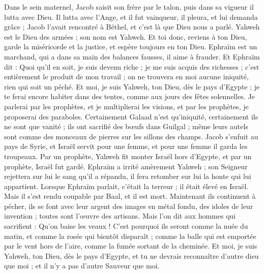 \begin{multicols}{2}
Dans le sein maternel, Jacob saisit son frère par le talon, puis dans sa vigueur il lutta avec Dieu.
Il lutta avec l’Ange, et il fut vainqueur, il pleura, et lui demanda grâce ; Jacob l’avait rencontré à Béthel, et c’est là que Dieu nous a parlé.
Yahweh est le Dieu des armées ; son nom est Yahweh.
Et toi donc, reviens à ton Dieu, garde la miséricorde et la justice, et espère toujours en ton Dieu.
Ephraïm est un marchand, qui a dans sa main des balances fausses, il aime à frauder.
Et Ephraïm dit : Quoi qu'il en soit, je suis devenu riche ; je me suis acquis des richesses ; c’est entièrement le produit de mon travail ; on ne trouvera en moi aucune iniquité, rien qui soit un péché.
Et moi, je suis Yahweh, ton Dieu, dès le pays d'Egypte ; je te ferai encore habiter dans des tentes, comme aux jours des fêtes solennelles.
Je parlerai par les prophètes, et je multiplierai les visions, et par les prophètes, je proposerai des paraboles.
Certainement Galaad n'est qu'iniquité, certainement ils ne sont que vanité ; ils ont sacrifié des bœufs dans Guilgal ; même leurs autels sont comme des monceaux de pierres sur les sillons des champs.
Jacob s'enfuit au pays de Syrie, et Israël servit pour une femme, et pour une femme il garda les troupeaux.
Par un prophète, Yahweh fit monter Israël hors d'Egypte, et par un prophète, Israël fut gardé.
Ephraïm a irrité amèrement Yahweh ; son Seigneur rejettera sur lui le sang qu’il a répandu, il fera retomber sur lui la honte qui lui appartient.
\VerseOne{}Lorsque Ephraïm parlait, c’était la terreur ; il était élevé en Israël. Mais il s'est rendu coupable par Baal, et il est mort.
Maintenant ils continuent à pécher, ils se font avec leur argent des images en métal fondu, des idoles de leur invention ; toutes sont l’œuvre des artisans. Mais l’on dit aux hommes qui sacrifient : Qu’on baise les veaux !
C'est pourquoi ils seront comme la nuée du matin, et comme la rosée qui bientôt disparaît ; comme la balle qui est emportée par le vent hors de l’aire, comme la fumée sortant de la cheminée.
Et moi, je suis Yahweh, ton Dieu, dès le pays d’Egypte, et tu ne devrais reconnaître d'autre dieu que moi ; et il n'y a pas d’autre Sauveur que moi.

\end{multicols}

